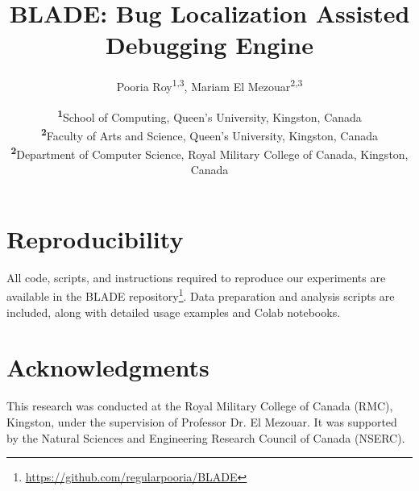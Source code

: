 \documentclass[onecolumn]{NobArticle}
\title{BLADE: Bug Localization Assisted Debugging Engine}
\author{
    Pooria Roy\textsuperscript{1,3}, 
    Mariam El Mezouar\textsuperscript{2,3}
}
\date{
    \textsuperscript{\textbf{1}}School of Computing, Queen's University, Kingston, Canada \\
    \textsuperscript{\textbf{2}}Faculty of Arts and Science, Queen's University, Kingston, Canada \\
    \textsuperscript{\textbf{2}}Department of Computer Science, Royal Military College of Canada, Kingston, Canada
}
\begin{document}
\small
\maketitle






% 
% 

\section{Reproducibility}
All code, scripts, and instructions required to reproduce our experiments are available in the BLADE repository\footnote{\url{https://github.com/regularpooria/BLADE}}. 
Data preparation and analysis scripts are included, along with detailed usage examples and Colab notebooks. 

\section*{Acknowledgments}
This research was conducted at the Royal Military College of Canada (RMC), Kingston, under the supervision of Professor Dr. El Mezouar. It was supported by the Natural Sciences and Engineering Research Council of Canada (NSERC).



\printbibliography
\end{document}
